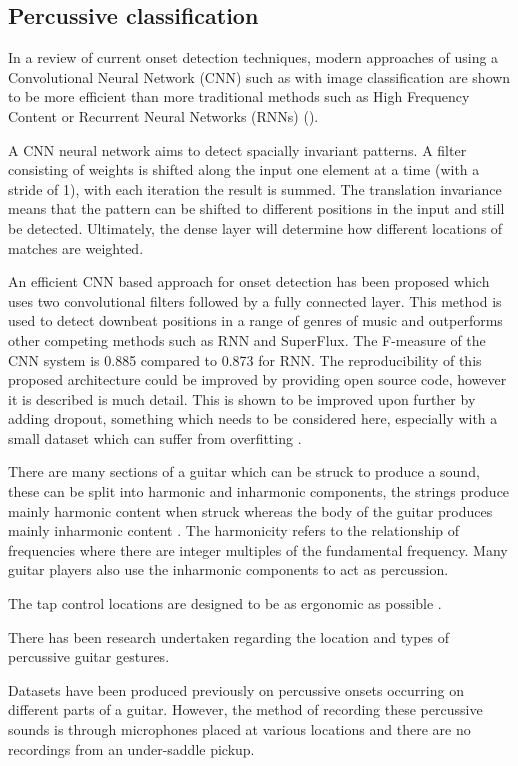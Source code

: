 \documentclass[conference]{IEEEtran}
\begin{document}
\subsection{Percussive classification}

In a review of current onset detection techniques, modern approaches of using a Convolutional Neural Network (CNN) such as with image classification are shown to be more efficient than 
more traditional methods such as High Frequency Content or Recurrent Neural Networks (RNNs) ().

A CNN neural network aims to detect spacially invariant patterns. A filter consisting of weights is shifted along the input one element at a time (with a stride of 1), with each iteration the result is summed.
The translation invariance means that the pattern can be shifted to different positions in the input and still be detected. Ultimately, the dense layer will determine how different locations of matches
are weighted.

An efficient CNN based approach for onset detection has been proposed \cite{b1} which uses two convolutional filters followed by a fully connected layer. This method is used to detect
downbeat positions in a range of genres of music and outperforms other competing methods such as RNN and SuperFlux. The F-measure of the CNN system is 0.885 compared to 0.873 for RNN. The reproducibility of 
this proposed architecture could be improved by providing open source code, however it is described is much detail. This
is shown to be improved upon further by adding dropout, something which needs to be considered here, especially with a small dataset which can suffer from overfitting \cite{b8}.

There are many sections of a guitar which can be struck to produce a sound, these can be split into harmonic and inharmonic components, the strings produce mainly harmonic content when
struck whereas the body of the guitar produces mainly inharmonic content . The harmonicity refers to the relationship of frequencies where there are integer multiples of the fundamental frequency.
Many guitar players also use the inharmonic components to act as percussion. 

The tap control locations are designed to be as ergonomic as possible . 

There has been research undertaken regarding the location and types of percussive guitar gestures. 

Datasets have been produced previously on percussive onsets occurring on different parts of a guitar. However, the method of recording these percussive sounds is through microphones placed at various locations and there
are no recordings from an under-saddle pickup. 
\end{document}
